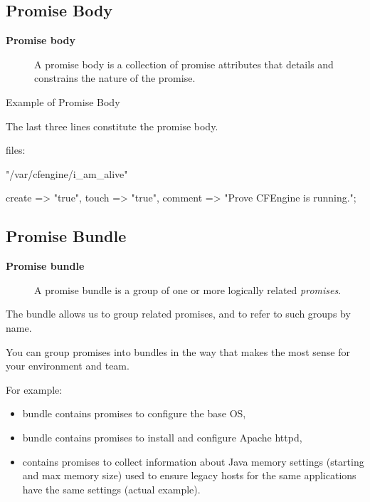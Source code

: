 \subsection{Promise Body}

\begin{description}
\item[\textbf{Promise body}] A promise body is a collection of promise attributes that details and
constrains the nature of the promise.
\end{description}





Example of Promise Body

The last three lines constitute the promise body.

\begin{code}
files:

    "/var/cfengine/i_am_alive"

        create  => "true",
        touch   => "true",
        comment => "Prove CFEngine is running.";
\end{code}





\subsection{Promise Bundle}

\begin{description}
\item[\textbf{Promise bundle}] A promise bundle is a group of one or more logically related \emph{promises}.
\end{description}

The bundle allows us to group related promises, and to refer to such
groups by name.

You can group promises into bundles in the way that makes the most
sense for your environment and team.

For example:

\begin{itemize}
\item{}  bundle contains promises to configure the base OS,
\item{}  bundle contains promises to install and configure Apache httpd,
\item{}  contains promises to collect information about
Java memory settings (starting and max memory size) used to ensure legacy
hosts for the same applications have the same settings (actual example).
\end{itemize}





